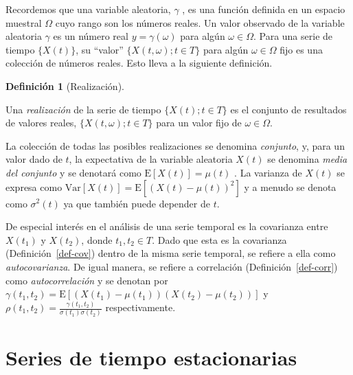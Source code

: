 \documentclass[
  letterpaper,
  DIV=11,
  numbers=noendperiod]{scrreport}
\theoremstyle{plain}
\theoremstyle{definition}
\newtheorem{definition}{Definición}[chapter]
\theoremstyle{definition}
\theoremstyle{plain}
\theoremstyle{remark}
\begin{document}
Recordemos que una variable aleatoria, \(\gamma\) , es una función
definida en un espacio muestral \(\Omega\) cuyo rango son los números
reales. Un valor observado de la variable aleatoria \(\gamma\) es un
número real \(y=\gamma(\omega)\) para algún \(\omega\in\Omega\). Para
una serie de tiempo \(\{X(t)\}\), su ``valor''
\(\{X(t,\omega);t\in T\}\) para algún \(\omega\in\Omega\) fijo es una
colección de números reales. Esto lleva a la siguiente definición.

\begin{definition}[Realización]\protect\hypertarget{def-realizacion}{}\label{def-realizacion}

Una \emph{realización} de la serie de tiempo \(\{X(t);t\in T\}\) es el
conjunto de resultados de valores reales, \(\{X(t,\omega);t\in T\}\)
para un valor fijo de \(\omega \in \Omega\).

\end{definition}

La colección de todas las posibles realizaciones se denomina
\emph{conjunto}, y, para un valor dado de \(t\), la expectativa de la
variable aleatoria \(X(t)\) se denomina \emph{media del conjunto} y se
denotará como \(\mathrm E[X(t)]=\mu(t)\) . La varianza de \(X(t)\) se
expresa como \(\mathrm{Var}[X(t)]=\mathrm E[(X(t)-\mu(t))^2]\) y a
menudo se denota como \(\sigma^2(t)\) ya que también puede depender de
\(t\).

\label{.remark}
De especial interés en el análisis de una serie temporal es la
covarianza entre \(X(t_1)\) y \(X(t_2)\), donde \(t_1, t_2\in T\). Dado
que esta es la covarianza (Definición~\ref{def-cov}) dentro de la misma
serie temporal, se refiere a ella como \emph{autocovarianza}. De igual
manera, se refiere a correlación (Definición~\ref{def-corr}) como
\emph{autocorrelación} y se denotan por
\(\gamma(t_1,t_2)= \mathrm{E}[(X(t_1)-\mu(t_1))(X(t_2)-\mu(t_2))]\) y
\(\rho(t_1,t_2)=\frac{\gamma(t_1,t_2)}{\sigma(t_1)\sigma(t_2)}\)
respectivamente.

\section{Series de tiempo
estacionarias}\label{series-de-tiempo-estacionarias}
\end{document}
